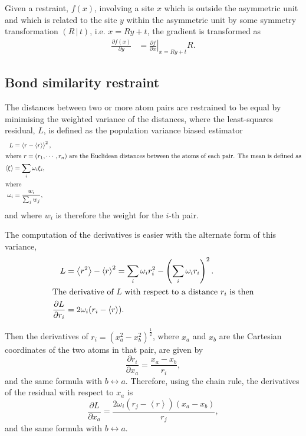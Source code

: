 \documentclass[pdf]{iucr}
\newcommand{\mean}[1]{\left\langle #1 \right\rangle}
\newcommand{\sym}[2]{\left( #1\,\vert\, #2 \right)}
\newcommand{\partialder}[2]{\frac{\partial #1}{\partial #2}}
\begin{document}
Given a restraint, $f(x)$, involving a site $x$ which is outside the asymmetric unit and which is related to the site $y$ within the asymmetric unit by some symmetry transformation $\sym{R}{t}$, i.e. $x=Ry+t$, the gradient is transformed as
\begin{align}
\partialder{f(x)}{y}  &= \left.\partialder{f}{x}\right|_{x=Ry+t} R.
\label{eqn:partialder:transform:under:symmetry}
\end{align}

\subsection{Bond similarity restraint}

The distances between two or more atom pairs are restrained to be equal by minimising the weighted variance of the distances, where the least-squares residual, $L$, is defined as the population variance biased estimator
\begin{align}
\label{eqn:bond_similarity}
L &= \mean{r - \mean{r}}^2,\\
\shortintertext{where $r=(r_1, \cdots, r_n)$ are the Euclidean distances between the atoms of each pair. The mean is defined as}
\mean{\xi} &= \sum_i \omega_i \xi_i, \\
\shortintertext{where}
\omega_i &= \frac{w_i}{\sum_j w_j},
\end{align}
and where $w_i$ is therefore the weight for the $i$-th pair.

The computation of the derivatives is easier with the alternate form of this variance, 
\begin{align}
L &= \mean{r^2} - \mean{r}^2 = \sum_i \omega_i r_i^2 - \left(\sum_i \omega_i r_i\right)^2.\\
\shortintertext{The derivative of $L$ with respect to a distance $r_i$ is then}
\partialder{L}{r_i} &= 2 \omega_i(r_i - \mean{r}).
\end{align}

Then the derivatives of $r_i = (x_a^2 - x_b^2)^\frac{1}{2}$, where $x_a$ and $x_b$ are the Cartesian coordinates of the two atoms in that pair, are given by
\begin{equation}
\partialder{r_i}{x_a} = \frac{x_a - x_b}{r_i},
\end{equation}
and the same formula with $b \leftrightarrow a$.
Therefore, using the chain rule, the derivatives of the residual with respect to $x_a$ is
\begin{equation}
\partialder{L}{x_a} = \frac{2 \omega_i (r_j - \mean{r})(x_a - x_b)}{r_j},
\end{equation}
and the same formula with $b \leftrightarrow a$.
\end{document}
